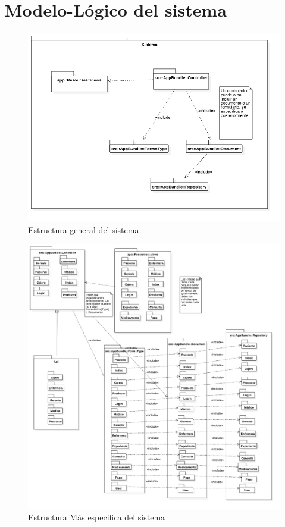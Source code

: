 \section{Modelo-Lógico del sistema}
\begin{figure}[htbp!]
		\centering
			\includegraphics[width=1\textwidth]{images/logico31}
		\caption{Estructura general del sistema}
	\end{figure}

\begin{figure}[htbp!]
		\centering
			\includegraphics[width=1\textwidth]{images/logico32}
		\caption{Estructura Más especifica del sistema}
	\end{figure}
	\newpage
